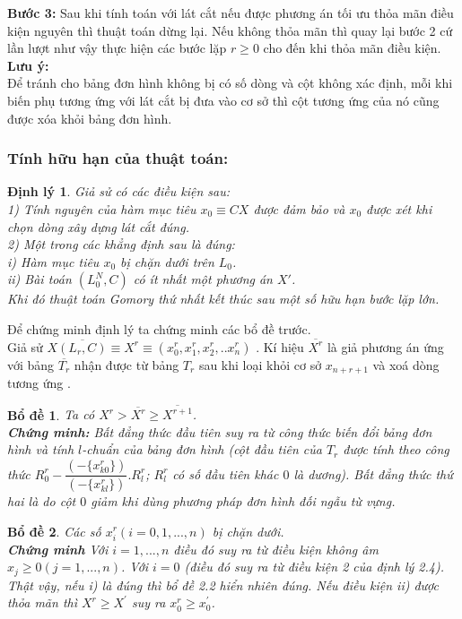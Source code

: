 \documentclass[12pt,a4paper]{report}
\newtheorem{dl}{Định lý}
\newtheorem{bd}{Bổ đề}
\begin{document}
\textbf{Bước 3:}
Sau khi tính toán với lát cắt nếu được phương án tối ưu thỏa mãn điều kiện nguyên thì thuật toán dừng lại. Nếu không thỏa mãn thì quay lại bước 2 cứ lần lượt như vậy thực hiện các bước lặp $r \ge 0$ cho đến khi thỏa mãn điều kiện.
\textbf{Lưu ý:}\\
Để tránh cho bảng đơn hình không bị có số dòng và cột không xác định, mỗi khi biến phụ tương ứng với lát cắt bị đưa vào cơ sở thì cột tương ứng của nó cũng được xóa khỏi bảng đơn hình.
\subsubsection{Tính hữu hạn của thuật toán:}
\begin{dl}
Giả sử có các điều kiện sau:\\
1) Tính nguyên của hàm mục tiêu $x_0\equiv CX$ được đảm bảo và $x_0$ được xét khi chọn dòng xây dựng lát cắt đúng.\\
2) Một trong các khẳng định sau là đúng:\\
i) Hàm mục tiêu $x_0$ bị chặn dưới trên $L_0$.\\ 
ii) Bài toán $(L_0^N,C)$ có ít nhất một phương án $X'$.\\
 Khi đó thuật toán Gomory thứ nhất kết thúc sau một số hữu hạn bước lặp lớn.
 \end{dl}
 Để chứng minh định lý ta chứng minh các bổ đề trước.\\
 Giả sử
$ X\overline{(L_r,C)}\equiv X^r \equiv (x_0^r, x_1^r,x_2^r,..x_n^r) $ . Kí hiệu $\overline{X^r}$  
là giả phương án ứng với bảng $\overline{T_r}$  nhận được từ bảng $T_r$ sau khi loại khỏi cơ sở $x_{n+r+1}$  và xoá dòng tương ứng .\\
 \begin{bd}
     Ta có $X^r > \overline{X^r} \ge \overline{X^ {r+1}}$.\\
\textbf{Chứng minh: }Bất đẳng thức đầu tiên suy ra từ công thức biến đổi bảng đơn hình và tính $l$-chuẩn của bảng đơn hình (cột đầu tiên của $T_r$ được tính theo công thức $R^r_0-\dfrac{(- \{x_{k0}^r\})}{(-\{x_{kl}^r\})} . R^r_l$; $R^r_l$ có số đầu tiên khác $0$ là dương). Bất đẳng thức thứ hai là do cột $0$ giảm khi dùng phương pháp đơn hình đối ngẫu từ vựng.\\
    
 \end{bd}
  \begin{bd} Các số $x_{i} ^r (i=0,1,...,n)$ bị chặn dưới.\\
    \textbf{Chứng minh} Với $i=1,...,n$ điều đó suy ra từ điều kiện không âm $x_j \ge 0 (j=1,...,n)$. Với $i=0$ (điều đó suy ra từ điều kiện 2 của định lý 2.4). Thật vậy, nếu i) là đúng thì bổ đề 2.2 hiển nhiên đúng. Nếu điều kiện ii) được thỏa mãn thì $X^{r} \ge X^{'}$ suy ra $x^{r} _0 \ge x_0 ^{'}$.
        
    \end{bd}
\end{document}

